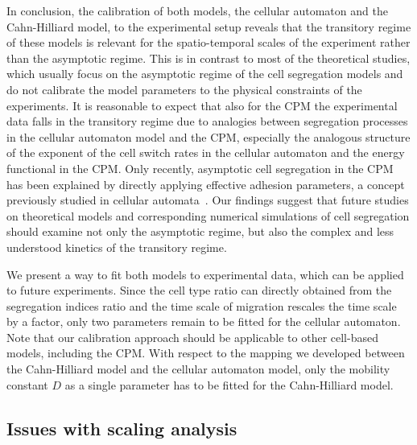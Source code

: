 \documentclass[10pt,letterpaper]{article}
\begin{document}
In conclusion, the calibration of both models, the cellular automaton
and the Cahn-Hilliard model, to the experimental setup reveals that
the transitory regime of these models is relevant for the
spatio-temporal scales of the experiment rather than the asymptotic
regime. This is in contrast to most of the theoretical studies, which
usually focus on the asymptotic regime of the cell segregation models
and do not calibrate the model parameters to the physical constraints
of the experiments. It is reasonable to expect that also for the CPM
the experimental data falls in the transitory regime due to analogies
between segregation processes in the cellular automaton model and the
CPM, especially the analogous structure of the exponent of the cell
switch rates in the cellular automaton and the energy functional in
the CPM. Only recently, asymptotic cell segregation in the CPM has
been explained by directly applying effective adhesion parameters, a
concept previously studied in cellular
automata~\cite{CanZarKasFraFag2017,RosBoeLanVos2021}. Our findings
suggest that future studies on theoretical models and corresponding
numerical simulations of cell segregation should examine not only the
asymptotic regime, but also the complex and less understood kinetics
of the transitory regime.

We present a way to fit both models to experimental data, which can be
applied to future experiments. Since the cell type ratio can directly
obtained from the segregation indices ratio and the time scale of
migration rescales the time scale by a factor, only two parameters
remain to be fitted for the cellular automaton. Note that our
calibration approach should be applicable to other cell-based models,
including the CPM. With respect to the mapping we developed between
the Cahn-Hilliard model and the cellular automaton model, only the
mobility constant $D$ as a single parameter has to be fitted for the
Cahn-Hilliard model.

\subsection*{Issues with scaling analysis}
\end{document}
